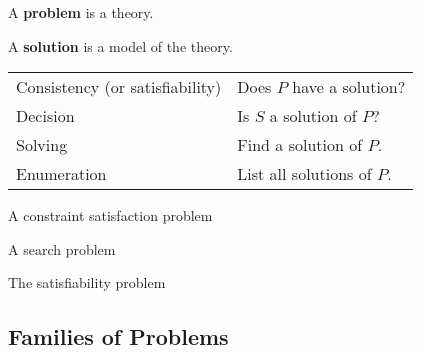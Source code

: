 \begin{definition}
A \textbf{problem} is a theory.

A \textbf{solution} is a model of the theory.
\end{definition}

\begin{center}
\begin{tabular}{ll}
Consistency (or satisfiability) & Does $P$ have a solution?\\
Decision & Is $S$ a solution of $P$? \\
Solving & Find a solution of $P$.\\
Enumeration & List all solutions of $P$.\\
\end{tabular}
\end{center}

\begin{example}
A constraint satisfaction problem

\end{example}

\begin{example}
A search problem
\end{example}

\begin{example}
The satisfiability problem

\end{example}

\subsection{Families of Problems}

%
